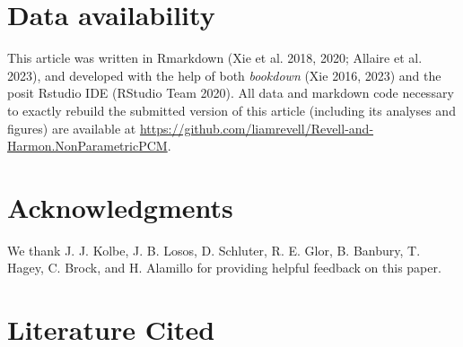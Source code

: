 \documentclass[fleqn,10pt,lineno]{wlpeerj} %
\begin{document}
\section{Data availability}\label{data-availability}

This article was written in Rmarkdown (Xie et al. 2018, 2020; Allaire et al. 2023), and developed with the help of both \emph{bookdown} (Xie 2016, 2023) and the posit Rstudio IDE (RStudio Team 2020). All data and markdown code necessary to exactly rebuild the submitted version of this article (including its analyses and figures) are available at \url{https://github.com/liamrevell/Revell-and-Harmon.NonParametricPCM}.

\section{Acknowledgments}\label{acknowledgments}

We thank J. J. Kolbe, J. B. Losos, D. Schluter, R. E. Glor, B. Banbury, T. Hagey, C. Brock, and H. Alamillo for providing helpful feedback on this paper.

\section*{Literature Cited}\label{literature-cited}
\end{document}
